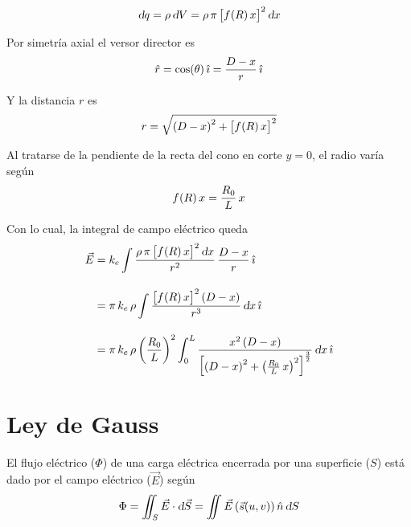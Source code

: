 \documentclass[a5paper,12pt,twoside]{book}
\begin{document}
\begin{mdframed}[style=MyFrame2]

    \begin{equation*}
        \textsl{d} q = \rho \, \textsl{d} V = \rho \, \pi \, { \begin{bmatrix} f \hspace{-0.5mm} \left( R \right){x} \end{bmatrix} }^2 \, \textsl{d} x
    \end{equation*}

    Por simetría axial el versor director es
    \begin{equation*}
        \hat{r} = \cos(\theta) \, \hat{\imath}
        = \frac{D-x}{r} \, \hat{\imath}
    \end{equation*}

    Y la distancia $r$ es
    \begin{equation*}
        r = \sqrt{\left(D-x\right)^2 + { \begin{bmatrix} f \hspace{-0.5mm} \left( R \right){x} \end{bmatrix} }^2}
    \end{equation*}

    Al tratarse de la pendiente de la recta del cono en corte $y=0$, el radio varía según
    \begin{equation*}
        f \hspace{-0.5mm} \left( R \right){x} = \frac{R_0}{L} \, x
    \end{equation*}

    Con lo cual, la integral de campo eléctrico queda
    \begin{align*}
        \vec{E} &= k_e \int \frac{\rho \, \pi \, { \begin{bmatrix} f \hspace{-0.5mm} \left( R \right){x} \end{bmatrix} }^2 \, \textsl{d} x}{r^2} \, \frac{D-x}{r} \, \hat{\imath}
        \\[1em]
        &= \pi \, k_e \, \rho \int \frac{{ \begin{bmatrix} f \hspace{-0.5mm} \left( R \right){x} \end{bmatrix} }^2 \left(D-x\right)}{r^3} \, \textsl{d} x \, \hat{\imath}
        \\[1em]
        &= \pi \, k_e \, \rho \left(\frac{R_0}{L}\right)^2 \int_0^L \frac{x^2 \left(D-x\right)}{{ \begin{bmatrix} \left(D-x\right)^2 + \left(\frac{R_0}{L} \, x\right)^2 \end{bmatrix} }^{\frac{3}{2}}} \, \textsl{d} x \, \hat{\imath}
    \end{align*}
\end{mdframed}


\section{Ley de Gauss}

El flujo eléctrico ($\Phi$) de una carga eléctrica encerrada por una superficie ($S$) está dado por el campo eléctrico ($\Vec{E}$) según
\begin{equation*}
    \Phi = \iint_S \Vec{E} \cdot \textsl{d} \Vec{S} = \iint \Vec{E} \left(\Vec{s}(u,v)\right) \hat{n} \, \textsl{d} S
\end{equation*}
\end{document}
